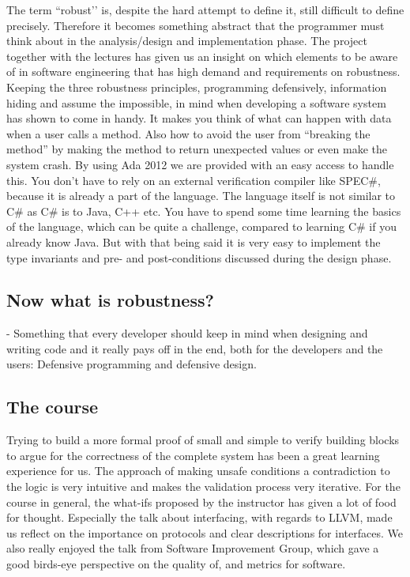 \documentclass[10pt,a4paper]{article}
\begin{document}
The term ``robust’' is, despite the hard attempt to define it, still difficult to define precisely. Therefore it becomes something abstract that the programmer must think about in the analysis/design and implementation phase. The project together with the lectures has given us an insight on which elements to be aware of in software engineering that has high demand and requirements on robustness.
Keeping the three robustness principles, programming defensively, information hiding and assume the impossible, in mind when developing a software system has shown to come in handy. It makes you think of what can happen with data when a user calls a method. Also how to avoid the user from ``breaking the method'' by making the method to return unexpected values or even make the system crash.
By using Ada 2012 we are provided with an easy access to handle this. You don’t
have to rely on an external verification compiler like SPEC\#, because it is already a part of the language. The language itself is not similar to C\# as C\# is to Java, C++ etc. You have to spend some time learning the basics of the language, which can be quite a challenge, compared to learning C\# if you already know Java. But with that being said it is very easy to implement the type invariants and pre- and post-conditions discussed during the design phase.

\subsection{Now what is robustness?}
- Something that every developer should keep in mind when designing and writing code and it really pays off in the end, both for the developers and the users: Defensive programming and defensive design.

\subsection{The course}
Trying to build a more formal proof of small and simple to verify building blocks to argue for the correctness of the complete system has been a great learning experience for us. The approach of making unsafe conditions a contradiction to the logic is very intuitive and makes the validation process very iterative. For the course in general, the what-ifs proposed by the instructor has given a lot of food for thought. Especially the talk about interfacing, with regards to LLVM, made us reflect on the importance on protocols and clear descriptions for interfaces.
We also really enjoyed the talk from Software Improvement Group, which gave a good birds-eye perspective on the quality of, and metrics for software.



\nocite{Dijkstra:1979:PCH:1241515.1241516}
\nocite{Chapman:2006:CCM:1151816.1151820}
\nocite{bishop2004teaching}
\nocite{Wikipedia:Defensive_programming}
\nocite{Wikipedia:OO_encapsulation}
\end{document}
